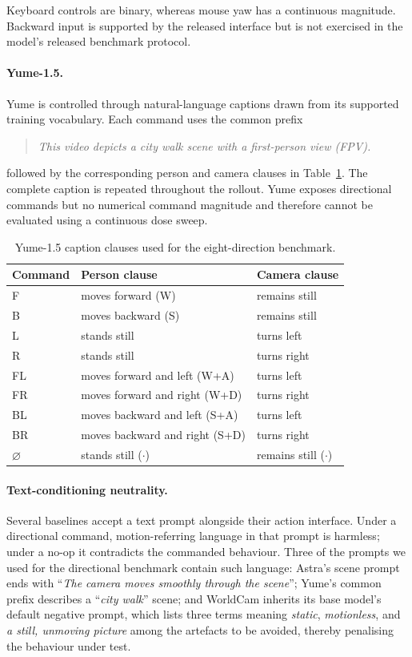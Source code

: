 Keyboard controls are binary, whereas mouse yaw has a continuous magnitude.
Backward input is supported by the released interface but is not exercised in
the model's released benchmark protocol.

\paragraph{Yume-1.5.}
Yume is controlled through natural-language captions drawn from its supported
training vocabulary. Each command uses the common prefix
\begin{quote}
\small
\emph{This video depicts a city walk scene with a first-person view (FPV).}
\end{quote}
followed by the corresponding person and camera clauses in
Table~\ref{tab:yume_commands}. The complete caption is repeated throughout
the rollout. Yume exposes directional commands but no numerical command
magnitude and therefore cannot be evaluated using a continuous dose sweep.

\begin{table}[t]
\centering
{
\small
\begin{tabular}{lll}
\toprule
Command & Person clause & Camera clause \\
\midrule
F  & moves forward (W)              & remains still \\
B  & moves backward (S)             & remains still \\
L  & stands still                   & turns left \\
R  & stands still                   & turns right \\
FL & moves forward and left (W+A)   & turns left \\
FR & moves forward and right (W+D)  & turns right \\
BL & moves backward and left (S+A)  & turns left \\
BR & moves backward and right (S+D) & turns right \\
$\varnothing$ & stands still ($\cdot$) & remains still ($\cdot$) \\
\bottomrule
\end{tabular}
}
\caption{
    Yume-1.5 caption clauses used for the eight-direction benchmark.
}
\label{tab:yume_commands}
\end{table}

\paragraph{Text-conditioning neutrality.}
Several baselines accept a text prompt alongside their action interface. Under
a directional command, motion-referring language in that prompt is harmless;
under a no-op it contradicts the commanded behaviour. Three of the prompts we
used for the directional benchmark contain such language: Astra's scene prompt
ends with ``\emph{The camera moves smoothly through the scene}''; Yume's
common prefix describes a ``\emph{city walk}'' scene; and WorldCam inherits
its base model's default negative prompt, which lists three terms meaning
\emph{static}, \emph{motionless}, and \emph{a still, unmoving picture} among
the artefacts to be avoided, thereby penalising the behaviour under test.

